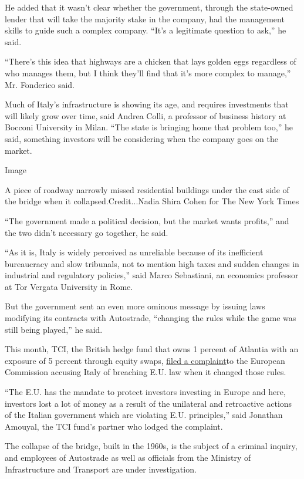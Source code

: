 He added that it wasn't clear whether the government, through the
state-owned lender that will take the majority stake in the company, had
the management skills to guide such a complex company. ``It's a
legitimate question to ask,'' he said.

``There's this idea that highways are a chicken that lays golden eggs
regardless of who manages them, but I think they'll find that it's more
complex to manage,'' Mr. Fonderico said.

Much of Italy's infrastructure is showing its age, and requires
investments that will likely grow over time, said Andrea Colli, a
professor of business history at Bocconi University in Milan. ``The
state is bringing home that problem too,'' he said, something investors
will be considering when the company goes on the market.

Image

A piece of roadway narrowly missed residential buildings under the east
side of the bridge when it collapsed.Credit...Nadia Shira Cohen for The
New York Times

``The government made a political decision, but the market wants
profits,'' and the two didn't necessary go together, he said.

``As it is, Italy is widely perceived as unreliable because of its
inefficient bureaucracy and slow tribunals, not to mention high taxes
and sudden changes in industrial and regulatory policies,'' said Marco
Sebastiani, an economics professor at Tor Vergata University in Rome.

But the government sent an even more ominous message by issuing laws
modifying its contracts with Autostrade, ``changing the rules while the
game was still being played,'' he said.

This month, TCI, the British hedge fund that owns 1 percent of Atlantia
with an exposure of 5 percent through equity swaps,
\href{https://www.tcifund.com/files/corporateengageement/atlantia/TCI\%20-\%20Formal\%20complaint\%20filed\%20at\%20the\%20EU\%20level.pdf}{filed
a complaint}to the European Commission accusing Italy of breaching E.U.
law when it changed those rules.

``The E.U. has the mandate to protect investors investing in Europe and
here, investors lost a lot of money as a result of the unilateral and
retroactive actions of the Italian government which are violating E.U.
principles,'' said Jonathan Amouyal, the TCI fund's partner who lodged
the complaint.

The collapse of the bridge, built in the 1960s, is the subject of a
criminal inquiry, and employees of Autostrade as well as officials from
the Ministry of Infrastructure and Transport are under investigation.

